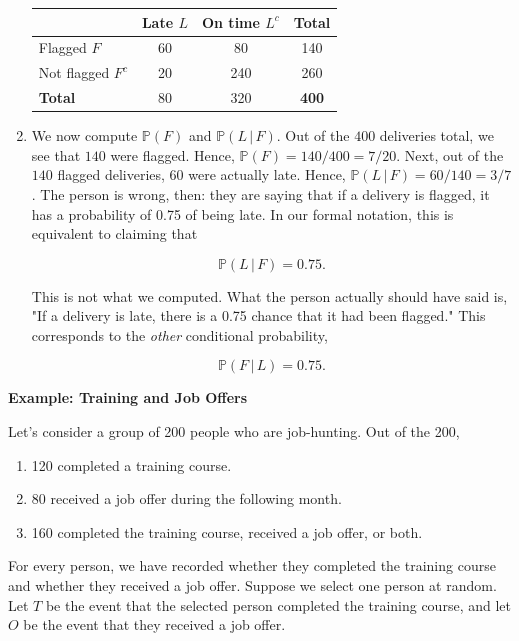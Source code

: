 \documentclass[11pt,letterpaper]{article}
\newcommand{\blocktitle}[1]{\par\addvspace{9pt}\noindent\textbf{#1}\par\nopagebreak\vspace{2pt}\nopagebreak}
\begin{document}
\begin{enumerate}[label=\alph*.]
\begin{center}
\small
\begin{tabular}{|l|c|c|c|}
\hline
 & \textbf{Late $L$} & \textbf{On time $L^c$} & \textbf{Total} \\ \hline
Flagged $F$ & 60 & 80 & 140 \\ \hline
Not flagged $F^c$ & 20 & 240 & 260 \\ \hline
\textbf{Total} & 80 & 320 & \textbf{400} \\ \hline
\end{tabular}
\end{center}

\item We now compute $\mathbb P(F)$ and $\mathbb P(L \,|\, F)$. Out of the $400$ deliveries total, we see that $140$ were flagged. Hence, $\mathbb P(F) = 140/400 = 7/20$. Next, out of the $140$ flagged deliveries, $60$ were actually late. Hence, $\mathbb P(L \,|\, F) = 60/140 = 3/7$. The person is wrong, then: they are saying that if a delivery is flagged, it has a probability of 0.75 of being late. In our formal notation, this is equivalent to claiming that

\[
\mathbb P(L \,|\, F) = 0.75.
\]

This is not what we computed. What the person actually should have said is, "If a delivery is late, there is a 0.75 chance that it had been flagged." This corresponds to the \emph{other} conditional probability,

\[
\mathbb P(F \,|\, L) = 0.75.
\]

\end{enumerate}

\clearpage
\blocktitle{Example: Training and Job Offers}

Let's consider a group of 200 people who are job-hunting. Out of the 200,

\begin{enumerate}[label=\roman*.]

\item 120 completed a training course.

\item 80 received a job offer during the following month.

\item 160 completed the training course, received a job offer, or both.

\end{enumerate}

For every person, we have recorded whether they completed the training course and whether they received a job offer. Suppose we select one person at random. Let $T$ be the event that the selected person completed the training course, and let $O$ be the event that they received a job offer.
\end{document}
